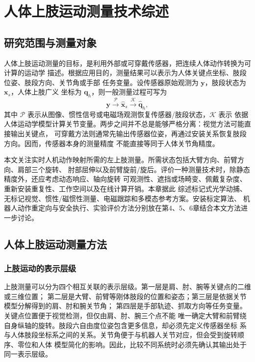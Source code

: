 
\chapter{人体上肢运动测量技术综述}
\label{chap:literature_review}

\section{研究范围与测量对象}
\label{sec:ch2_scope}

人体上肢运动测量的目标，是利用外部或可穿戴传感器，把连续人体动作转换为可计算的运动学
描述。根据应用目的，测量结果可以表示为人体关键点坐标、肢段位姿、肢段方向、关节角或手部
任务变量。设传感器原始观测为 $\boldsymbol y$，肢段状态为 $\boldsymbol x_s$，人体上肢广义
坐标为 $\boldsymbol q_h$，则一般测量过程可写为
\begin{equation}
  \boldsymbol y
  \xrightarrow{\mathcal P}
  \hat{\boldsymbol x}_s
  \xrightarrow{\mathcal K}
  \hat{\boldsymbol q}_h,
  \label{eq:ch2_measurement_chain}
\end{equation}
其中 $\mathcal P$ 表示从图像、惯性信号或电磁场观测恢复传感器/肢段状态，$\mathcal K$ 表示
依据人体运动学模型计算关节变量。两步之间并不总是能够严格分离：视觉方法可能直接输出关键点，
可穿戴方法则通常先输出传感器位姿，再通过安装关系恢复肢段方向。因而，传感器本身的测量精度
不能直接等同于人体关节角精度。

本文关注实时人机动作映射所需的左上肢测量。所需状态包括大臂方向、前臂方向、肩部三个旋转、
肘部屈伸以及前臂旋前/旋后。评价一种测量技术时，除静态精度外，还应考虑动态响应、轴向旋转
可观测性、遮挡或场畸变、佩戴复杂度、重新安装重复性、工作空间以及在线计算开销。本章据此
综述标记式光学动捕、无标记视觉、惯性/磁惯性测量、电磁跟踪和多模态参考方案。安装标定算法、
机器人动作重定向与安全执行、实验评价方法分别放在第4、5、6章结合本文方法进一步讨论。

\section{人体上肢运动测量方法}
\label{sec:ch2_human_motion_capture}

\subsection{上肢运动的表示层级}
\label{subsec:ch2_motion_representation}

上肢测量可以分为四个相互关联的表示层级。第一层是肩、肘、腕等关键点的二维或三维位置；
第二层是大臂、前臂等刚体肢段的位置和姿态；第三层是依据关节模型分解得到的肩、肘和腕关节角；
第四层是手部轨迹、抓取方向等任务变量。关键点位置便于视觉检测，但仅由肩、肘、腕三个点不能
唯一确定大臂和前臂绕自身纵轴的旋转。肢段六自由度位姿包含更多信息，却必须先定义传感器坐标
系与人体肢段坐标系之间的关系。关节角便于与机器人关节对应，但会受到旋转顺序、零位和人体
模型简化的影响。因此，比较不同系统时必须先确认其输出处于同一表示层级。

